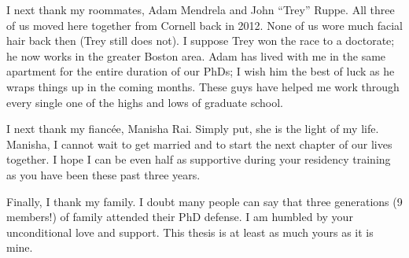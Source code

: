 I next thank my roommates,
Adam Mendrela and John ``Trey'' Ruppe.
All three of us moved here together
from Cornell back in 2012.
None of us wore much facial hair back then
(Trey still does not).
I suppose Trey won the race to a doctorate;
he now works in the greater Boston area.
Adam has lived with me 
in the same apartment
for the entire duration of our PhDs;
I wish him the best of luck
as he wraps things up in the coming months.
These guys have helped me
work through every single one 
of the highs and lows
of graduate school.

I next thank my fianc\'{e}e, Manisha Rai.
Simply put,
she is the light of my life.
Manisha,
I cannot wait to get married
and to start the next chapter 
of our lives together.
I hope I can be even half as supportive
during your residency training
as you have been these past three years.

Finally,
I thank my family.
I doubt many people can say
that three generations (9 members!) of family
attended their PhD defense.
I am humbled by your unconditional love and support.
This thesis is at least as much yours as it is mine.

